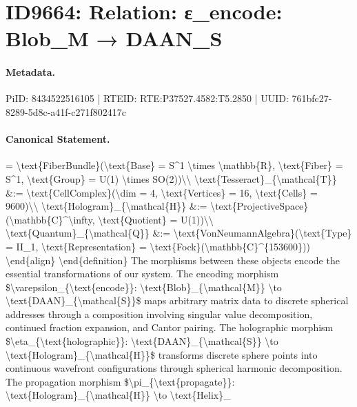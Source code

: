 \section*{ID9664: Relation: ε\_encode: Blob\_M → DAAN\_S}
\paragraph{Metadata.}
PiID: 8434522516105 | RTEID: RTE:P37527.4582:T5.2850 | UUID: 761bfc27-8289-5d8c-a41f-c271f802417c

\paragraph{Canonical Statement.}
= \textbackslash{}text\{FiberBundle\}(\textbackslash{}text\{Base\} = S\textasciicircum{}1 \textbackslash{}times \textbackslash{}mathbb\{R\}, \textbackslash{}text\{Fiber\} = S\textasciicircum{}1, \textbackslash{}text\{Group\} = U(1) \textbackslash{}times SO(2))\textbackslash{}\textbackslash{} \textbackslash{}text\{Tesseract\}\_\{\textbackslash{}mathcal\{T\}\} \&:= \textbackslash{}text\{CellComplex\}(\textbackslash{}dim = 4, \textbackslash{}text\{Vertices\} = 16, \textbackslash{}text\{Cells\} = 9600)\textbackslash{}\textbackslash{} \textbackslash{}text\{Hologram\}\_\{\textbackslash{}mathcal\{H\}\} \&:= \textbackslash{}text\{ProjectiveSpace\}(\textbackslash{}mathbb\{C\}\textasciicircum{}\textbackslash{}infty, \textbackslash{}text\{Quotient\} = U(1))\textbackslash{}\textbackslash{} \textbackslash{}text\{Quantum\}\_\{\textbackslash{}mathcal\{Q\}\} \&:= \textbackslash{}text\{VonNeumannAlgebra\}(\textbackslash{}text\{Type\} = II\_1, \textbackslash{}text\{Representation\} = \textbackslash{}text\{Fock\}(\textbackslash{}mathbb\{C\}\textasciicircum{}\{153600\})) \textbackslash{}end\{align\} \textbackslash{}end\{definition\} The morphisms between these objects encode the essential transformations of our system. The encoding morphism \$\textbackslash{}varepsilon\_\{\textbackslash{}text\{encode\}\}: \textbackslash{}text\{Blob\}\_\{\textbackslash{}mathcal\{M\}\} \textbackslash{}to \textbackslash{}text\{DAAN\}\_\{\textbackslash{}mathcal\{S\}\}\$ maps arbitrary matrix data to discrete spherical addresses through a composition involving singular value decomposition, continued fraction expansion, and Cantor pairing. The holographic morphism \$\textbackslash{}eta\_\{\textbackslash{}text\{holographic\}\}: \textbackslash{}text\{DAAN\}\_\{\textbackslash{}mathcal\{S\}\} \textbackslash{}to \textbackslash{}text\{Hologram\}\_\{\textbackslash{}mathcal\{H\}\}\$ transforms discrete sphere points into continuous wavefront configurations through spherical harmonic decomposition. The propagation morphism \$\textbackslash{}pi\_\{\textbackslash{}text\{propagate\}\}: \textbackslash{}text\{Hologram\}\_\{\textbackslash{}mathcal\{H\}\} \textbackslash{}to \textbackslash{}text\{Helix\}\_

